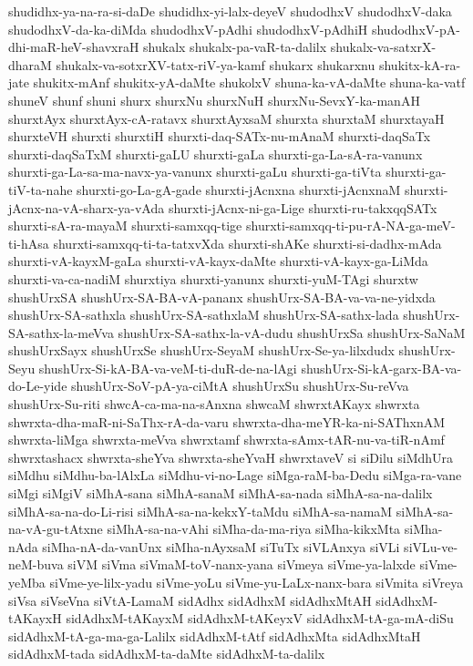 {shudidhx-ya-na-ra-si-daDe
shudidhx-yi-lalx-deyeV
shudodhxV
shudodhxV-daka
shudodhxV-da-ka-diMda
shudodhxV-pAdhi
shudodhxV-pAdhiH
shudodhxV-pA-dhi-maR-heV-shavxraH
shukalx
shukalx-pa-vaR-ta-dalilx
shukalx-va-satxrX-dharaM
shukalx-va-sotxrXV-tatx-riV-ya-kamf
shukarx
shukarxnu
shukitx-kA-ra-jate
shukitx-mAnf
shukitx-yA-daMte
shukolxV
shuna-ka-vA-daMte
shuna-ka-vatf
shuneV
shunf
shuni
shurx
shurxNu
shurxNuH
shurxNu-SevxY-ka-manAH
shurxtAyx
shurxtAyx-cA-ratavx
shurxtAyxsaM
shurxta
shurxtaM
shurxtayaH
shurxteVH
shurxti
shurxtiH
shurxti-daq-SATx-nu-mAnaM
shurxti-daqSaTx
shurxti-daqSaTxM
shurxti-gaLU
shurxti-gaLa
shurxti-ga-La-sA-ra-vanunx
shurxti-ga-La-sa-ma-navx-ya-vanunx
shurxti-gaLu
shurxti-ga-tiVta
shurxti-ga-tiV-ta-nahe
shurxti-go-La-gA-gade
shurxti-jAcnxna
shurxti-jAcnxnaM
shurxti-jAcnx-na-vA-sharx-ya-vAda
shurxti-jAcnx-ni-ga-Lige
shurxti-ru-takxqqSATx
shurxti-sA-ra-mayaM
shurxti-samxqq-tige
shurxti-samxqq-ti-pu-rA-NA-ga-meV-ti-hAsa
shurxti-samxqq-ti-ta-tatxvXda
shurxti-shAKe
shurxti-si-dadhx-mAda
shurxti-vA-kayxM-gaLa
shurxti-vA-kayx-daMte
shurxti-vA-kayx-ga-LiMda
shurxti-va-ca-nadiM
shurxtiya
shurxti-yanunx
shurxti-yuM-TAgi
shurxtw
shushUrxSA
shushUrx-SA-BA-vA-pananx
shushUrx-SA-BA-va-va-ne-yidxda
shushUrx-SA-sathxla
shushUrx-SA-sathxlaM
shushUrx-SA-sathx-lada
shushUrx-SA-sathx-la-meVva
shushUrx-SA-sathx-la-vA-dudu
shushUrxSa
shushUrx-SaNaM
shushUrxSayx
shushUrxSe
shushUrx-SeyaM
shushUrx-Se-ya-lilxdudx
shushUrx-Seyu
shushUrx-Si-kA-BA-va-veM-ti-duR-de-na-lAgi
shushUrx-Si-kA-garx-BA-va-do-Le-yide
shushUrx-SoV-pA-ya-ciMtA
shushUrxSu
shushUrx-Su-reVva
shushUrx-Su-riti
shwcA-ca-ma-na-sAnxna
shwcaM
shwrxtAKayx
shwrxta
shwrxta-dha-maR-ni-SaThx-rA-da-varu
shwrxta-dha-meYR-ka-ni-SAThxnAM
shwrxta-liMga
shwrxta-meVva
shwrxtamf
shwrxta-sAmx-tAR-nu-va-tiR-nAmf
shwrxtashacx
shwrxta-sheYva
shwrxta-sheYvaH
shwrxtaveV
si
siDilu
siMdhUra
siMdhu
siMdhu-ba-lAlxLa
siMdhu-vi-no-Lage
siMga-raM-ba-Dedu
siMga-ra-vane
siMgi
siMgiV
siMhA-sana
siMhA-sanaM
siMhA-sa-nada
siMhA-sa-na-dalilx
siMhA-sa-na-do-Li-risi
siMhA-sa-na-kekxY-taMdu
siMhA-sa-namaM
siMhA-sa-na-vA-gu-tAtxne
siMhA-sa-na-vAhi
siMha-da-ma-riya
siMha-kikxMta
siMha-nAda
siMha-nA-da-vanUnx
siMha-nAyxsaM
siTuTx
siVLAnxya
siVLi
siVLu-ve-neM-buva
siVM
siVma
siVmaM-toV-nanx-yana
siVmeya
siVme-ya-lalxde
siVme-yeMba
siVme-ye-lilx-yadu
siVme-yoLu
siVme-yu-LaLx-nanx-bara
siVmita
siVreya
siVsa
siVseVna
siVtA-LamaM
sidAdhx
sidAdhxM
sidAdhxMtAH
sidAdhxM-tAKayxH
sidAdhxM-tAKayxM
sidAdhxM-tAKeyxV
sidAdhxM-tA-ga-mA-diSu
sidAdhxM-tA-ga-ma-ga-Lalilx
sidAdhxM-tAtf
sidAdhxMta
sidAdhxMtaH
sidAdhxM-tada
sidAdhxM-ta-daMte
sidAdhxM-ta-dalilx
}
